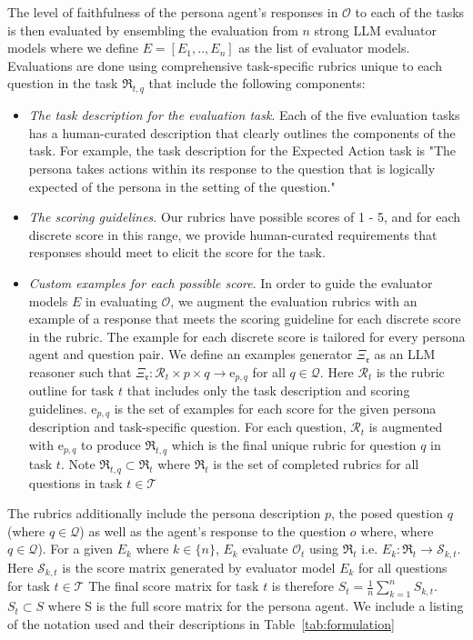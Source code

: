 The level of faithfulness of the persona agent's responses in $\mathcal{O}$ to each of the tasks is then evaluated by ensembling the evaluation from $n$ strong LLM evaluator models where we define $E = [E_1,..,E_n]$ as the list of evaluator models. Evaluations are done using comprehensive task-specific rubrics unique to each question in the task $\mathfrak{R}_{t,q}$ that include the following components:
\begin{itemize}
    \item \textit{The task description for the evaluation task}. Each of the five evaluation tasks has a human-curated description that clearly outlines the components of the task. For example, the task description for the Expected Action task is "The persona takes actions within its response to the question that is logically expected of the persona in the setting of the question."
    \item \textit{The scoring guidelines}. Our rubrics have possible scores of 1 - 5, and for each discrete score in this range, we provide human-curated requirements that responses should meet to elicit the score for the task. 
    \item \textit{Custom examples for each possible score}. In order to guide the evaluator models $E$ in evaluating $\mathcal{O}$, we augment the evaluation rubrics with an example of a response that meets the scoring guideline for each discrete score in the rubric. The example for each discrete score is tailored for every persona agent and question pair. We define an examples generator  $\Xi_{\mathfrak{r}}$ as an LLM reasoner such that $\Xi_{\mathfrak{r}}: \mathcal{R}_t \times p \times q \to \mathrm{e}_{p,q}$ for all $q \in \mathcal{Q}$. Here $\mathcal{R}_t$ is the rubric outline for task $t$ that includes only the task description and scoring guidelines. $\mathcal{\mathrm{e}}_{p,q}$ is the set of examples for each score for the given persona description and task-specific question. For each question, $\mathcal{R}_t$ is augmented with $\mathcal{\mathrm{e}}_{p,q}$ to produce $\mathfrak{R}_{t,q}$ which is the final unique rubric for question $q$ in task $t$. Note $\mathfrak{R}_{t,q} \subset \mathfrak{R}_{t}$ where $\mathfrak{R}_{t}$ is the set of completed rubrics for all questions in task $t \in \mathcal{T}$
\end{itemize}
The rubrics additionally include the persona description $p$, the posed question $q$ (where $q \in \mathcal{Q}$) as well as the agent's response to the question $o$ where, where $q \in \mathcal{Q}$). For a given $E_k$ where $k \in \{n\}$, $E_k$ evaluate $\mathcal{O}_t$ using $\mathfrak{R}_t$ i.e. $E_k: \mathfrak{R}_t \to \mathcal{S}_{k,t}$. Here $\mathcal{S}_{k,t}$ is the score matrix generated by evaluator model $E_k$ for all questions for task $t \in \mathcal{T}$ The final score matrix for task $t$ is therefore $S_t = \frac{1}{n}\sum_{k=1}^n S_{k,t}$. $S_t \subset S$ where S is the full score matrix for the persona agent. We include a listing of the notation used and their descriptions in Table~\ref{tab:formulation}

